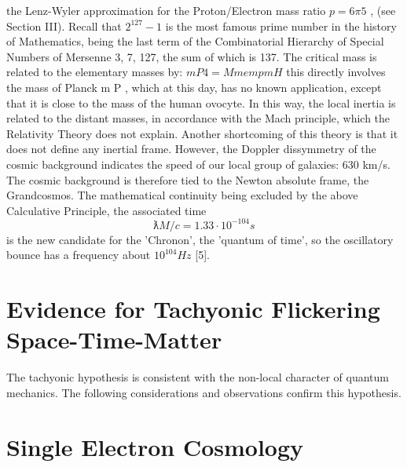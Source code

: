the Lenz-Wyler approximation for the Proton/Electron mass ratio $p = 6π 5$ , (see Section III). Recall
that $2^127 - 1$ is the most famous prime number in the history of Mathematics, being the last term of
the Combinatorial Hierarchy of Special Numbers of Mersenne 3, 7, 127, the sum of which is 137.
The critical mass is related to the elementary masses by:
$m P4 = M m e m p m H$
this directly involves the mass of Planck m P , which at this day, has no known application, except
that it is close to the mass of the human ovocyte. In this way, the local inertia is related to the distant
masses, in accordance with the Mach principle, which the Relativity Theory does not explain.
Another shortcoming of this theory is that it does not define any inertial frame. However, the
Doppler dissymmetry of the cosmic background indicates the speed of our local group of galaxies:
630 km/s. The cosmic background is therefore tied to the Newton absolute frame, the Grandcosmos.
The mathematical continuity being excluded by the above Calculative Principle, the associated
time $$ƛ M /c = 1.33 \cdot 10^{-104} s$$ is the new candidate for the 'Chronon', the 'quantum of time', so the
oscillatory bounce has a frequency about $10^{104} Hz$ [5].

\section {Evidence for Tachyonic Flickering Space-Time-Matter}

The tachyonic hypothesis is consistent with the non-local character of quantum mechanics. The
following considerations and observations confirm this hypothesis.

\section {Single Electron Cosmology}

